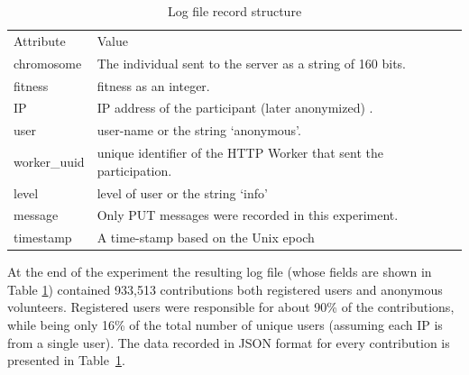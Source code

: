 \documentclass{llncs}
\begin{document}
\begin{table}[h!tbp]
  \small
  \caption{ Log file record structure}
  \label{tab:record}
  \centering
  \small
  \begin{tabular}{l  l}
    \hline\noalign{\smallskip}
    Attribute & Value \\
    \noalign{\smallskip}\hline\noalign{\smallskip}
    chromosome   & The individual sent to the server as a string of 160 bits.  \\ \hline
    fitness & fitness as an integer.  \\ \hline
    IP & IP address of the participant (later anonymized) .\\ \hline
    user & user-name or the string `anonymous'.  \\ \hline
    worker\_uuid & unique identifier of the HTTP Worker that sent the participation.   \\ \hline
    level &  level of user or the string `info' \\ \hline
    message & Only PUT messages were recorded in this experiment. \\ \hline
    timestamp & A time-stamp based on the Unix epoch\\ \hline
  \end{tabular}
\end{table}
%
At the end of the experiment the resulting log file (whose fields are shown in Table \ref{tab:record}) contained 933,513 contributions both
registered users and anonymous volunteers. Registered users were responsible for about
90\% of the contributions, while being only 16\% of the total number of unique users (assuming each IP is from a single user).
The data recorded in JSON format for every contribution is  presented
in Table~\ref{tab:record}.
\end{document}
